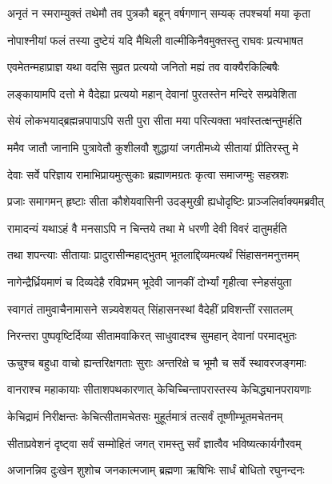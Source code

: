 \twolineshloka
{अनृतं न स्मराम्युक्तं तथेमौ तव पुत्रकौ}
{बहून् वर्षगणान् सम्यक् तपश्चर्या मया कृता} %

\twolineshloka
{नोपाश्नीयां फलं तस्या दुष्टेयं यदि मैथिली}
{वाल्मीकिनैवमुक्तस्तु राघवः प्रत्यभाषत} %

\twolineshloka
{एवमेतन्महाप्राज्ञ यथा वदसि सुव्रत}
{प्रत्ययो जनितो मह्यं तव वाक्यैरकिल्बिषैः} %

\twolineshloka
{लङ्कायामपि दत्तो मे वैदेह्या प्रत्ययो महान्}
{देवानां पुरतस्तेन मन्दिरे सम्प्रवेशिता} %

\twolineshloka
{सेयं लोकभयाद्ब्रह्मन्नपापाऽपि सती पुरा}
{सीता मया परित्यक्ता भवांस्तत्क्षन्तुमर्हति} %

\twolineshloka
{ममैव जातौ जानामि पुत्रावेतौ कुशीलवौ}
{शुद्धायां जगतीमध्ये सीतायां प्रीतिरस्तु मे} %

\twolineshloka
{देवाः सर्वे परिज्ञाय रामाभिप्रायमुत्सुकाः}
{ब्रह्माणमग्रतः कृत्वा समाजग्मुः सहस्रशः} %

\twolineshloka
{प्रजाः समागमन् हृष्टाः सीता कौशेयवासिनी}
{उदङ्मुखी ह्यधोदृष्टिः प्राञ्जलिर्वाक्यमब्रवीत्} %

\twolineshloka
{रामादन्यं यथाऽहं वै मनसाऽपि न चिन्तये}
{तथा मे धरणी देवी विवरं दातुमर्हति} %

\twolineshloka
{तथा शपन्त्याः सीतायाः प्रादुरासीन्महाद्भुतम्}
{भूतलाद्दिव्यमत्यर्थं सिंहासनमनुत्तमम्} %

\twolineshloka
{नागेन्द्रैर्ध्रियमाणं च दिव्यदेहै रविप्रभम्}
{भूदेवी जानकीं दोर्भ्यां गृहीत्वा स्नेहसंयुता} %

\twolineshloka
{स्वागतं तामुवाचैनामासने सन्न्यवेशयत्}
{सिंहासनस्थां वैदेहीं प्रविशन्तीं रसातलम्} %

\twolineshloka
{निरन्तरा पुष्पवृष्टिर्दिव्या सीतामवाकिरत्}
{साधुवादश्च सुमहान् देवानां परमाद्भुतः} %

\twolineshloka
{ऊचुश्च बहुधा वाचो ह्यन्तरिक्षगताः सुराः}
{अन्तरिक्षे च भूमौ च सर्वे स्थावरजङ्गमाः} %

\twolineshloka
{वानराश्च महाकायाः सीताशपथकारणात्}
{केचिच्चिन्तापरास्तस्य केचिद्ध्यानपरायणाः} %

\twolineshloka
{केचिद्रामं निरीक्षन्तः केचित्सीतामचेतसः}
{मुहूर्तमात्रं तत्सर्वं तूष्णीम्भूतमचेतनम्} %

\twolineshloka
{सीताप्रवेशनं दृष्ट्वा सर्वं सम्मोहितं जगत्}
{रामस्तु सर्वं ज्ञात्वैव भविष्यत्कार्यगौरवम्} %

\twolineshloka
{अजानन्निव दुःखेन शुशोच जनकात्मजाम्}
{ब्रह्मणा ऋषिभिः सार्धं बोधितो रघुनन्दनः} %


